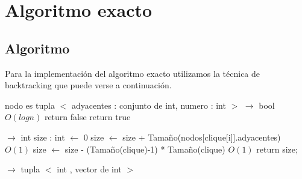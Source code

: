 \documentclass[a4paper, 10pt, twoside]{article}
\newenvironment{pseudo}[1][]{%
    \vspace{1em}%
    \begin{algorithmic}%
}
{%
    \end{algorithmic}%
    \vspace{1em}%
}
\newcommand{\Ode}[1]{\hfill $O(#1)$}
\begin{document}


\newpage

\section{Algoritmo exacto}
\subsection{Algoritmo}
Para la implementación del algoritmo exacto utilizamos la técnica de backtracking que puede verse a continuación.

\begin{pseudo}

\State nodo es tupla $<$ adyacentes : conjunto de int, numero : int $>$
\State
{} $\rightarrow$ bool
										\Ode{log n}
			\State return false
		\EndIf
	\EndFor
	\State return true
\EndProcedure

\State
{} $\rightarrow$ int 
	\State size : int $\leftarrow$ 0
		\State size $\leftarrow$ size + Tamaño(nodos[clique[i]].adyacentes)				\Ode{1}
	\EndFor
	\State size $\leftarrow$ size - (Tamaño(clique)-1) * Tamaño(clique)				\Ode{1}
	\State return size;
\EndProcedure

\State
{} $\rightarrow$ tupla $<$ int , vector de int $>$


\end{pseudo}
\end{document}
